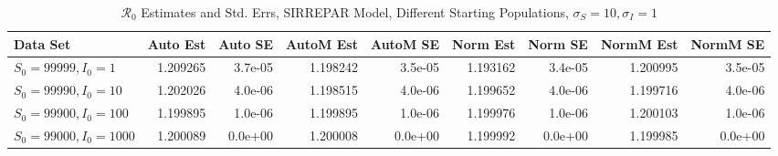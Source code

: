 \documentclass[12pt]{article}
\newcommand{\rr}{\ensuremath{\mathcal{R}_0}}
\begin{document}
\begin{table}[H]
	
	\caption{$\rr$ Estimates and Std. Errs, SIRREPAR Model,
		Different Starting Populations, 
		$\sigma_S = 10, \sigma_I = 1$}
	\begin{footnotesize}
		\hskip -1.7cm
	\begin{tabular}{l|r|r|r|r|r|r|r|r}
		\hline
		Data Set & Auto Est & Auto SE & AutoM Est & AutoM SE & Norm Est & Norm SE & NormM Est & NormM SE\\
		\hline
		$S_0 = 99999, I_0 = 1$ & 1.209265 & 3.7e-05 & 1.198242 & 3.5e-05 & 1.193162 & 3.4e-05 & 1.200995 & 3.5e-05\\
		\hline
		$S_0 = 99990, I_0 = 10$ & 1.202026 & 4.0e-06 & 1.198515 & 4.0e-06 & 1.199652 & 4.0e-06 & 1.199716 & 4.0e-06\\
		\hline
		$S_0 = 99900, I_0 = 100$ & 1.199895 & 1.0e-06 & 1.199895 & 1.0e-06 & 1.199976 & 1.0e-06 & 1.200103 & 1.0e-06\\
		\hline
		$S_0 = 99000, I_0 = 1000$ & 1.200089 & 0.0e+00 & 1.200008 & 0.0e+00 & 1.199992 & 0.0e+00 & 1.199985 & 0.0e+00\\
		\hline
	\end{tabular}
	\end{footnotesize}
\end{table}
\end{document}
